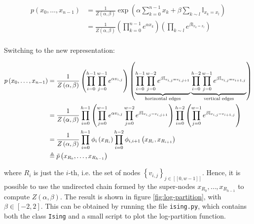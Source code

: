 \documentclass[a4paper, 11pt]{article}
\begin{document}
\begin{enumerate}[resume]
    \begin{equation*}
        \begin{aligned}
        p \left( x_0, \dots, x_{n-1} \right) &= \frac{1}{Z \left( \alpha, \beta \right)} \exp \left( \alpha \sum_{k=0}^{n-1} x_k + \beta \sum_{k \sim l} \mathbb{I}_{x_k = x_l} \right) \\
        &= \frac{1}{Z \left( \alpha, \beta \right)} \left( \prod_{k=0}^{n-1} e^{\alpha x_k} \right) \left( \prod_{k \sim l} e^{\beta \mathbb{I}_{x_k = x_l}} \right) \\
        \end{aligned}
    \end{equation*}
    
    Switching to the new representation:
    
    \begin{equation*}
        \begin{aligned}
        p \left( x_0, \dots, x_{n-1} \right) &= \frac{1}{Z \left( \alpha, \beta \right)} \left( \prod_{i=0}^{h-1} \prod_{j=0}^{w-1} e^{\alpha v_{i, j}} \right) \left( \underbrace{\prod_{i=0}^{h-1} \prod_{j=0}^{w-2} e^{\beta \mathbb{I}_{v_{i, j} = v_{i, j+1}}}}_{\text{horizontal edges}} \underbrace{\prod_{i=0}^{h-2} \prod_{j=0}^{w-1} e^{\beta \mathbb{I}_{v_{i, j} = v_{i+1, j}}}}_{\text{vertical edges}} \right) \\
        &= \frac{1}{Z \left( \alpha, \beta \right)} \prod_{i=0}^{h-1} \left( \prod_{j=0}^{w-1} e^{\alpha v_{i, j}} \prod_{j=0}^{w-2} e^{\beta \mathbb{I}_{v_{i, j} = v_{i, j+1}}} \right) \prod_{i=0}^{h-2} \left( \prod_{j=0}^{w-1} e^{\beta \mathbb{I}_{v_{i, j} = v_{i+1, j}}} \right) \\
        &= \frac{1}{Z \left( \alpha, \beta \right)} \prod_{i=0}^{h-1} \phi_{i} \left( x_{R_i} \right) \prod_{i=0}^{h-2} \phi_{i, i+1} \left( x_{R_i}, x_{R_{i+1}} \right) \\
        &\triangleq \Tilde{p} \left( x_{R_0}, \dots, x_{R_{h-1}} \right)
        \end{aligned}
    \end{equation*}

    where $R_i$ is just the $i$-th, i.e. the set of nodes $\left\{ v_{i, j} \right\}_{j \in [\![ 0, w-1 ]\!]}$. Hence, it is possible to use the undirected chain formed by the super-nodes $x_{R_0}, \dots, x_{R_{h-1}}$ to compute $Z \left( \alpha, \beta \right)$. The result is shown in figure \ref{fig:log-partition}, with $\beta \in [-2, 2]$. This can be obtained by running the file \texttt{ising.py}, which contains both the class \texttt{Ising} and a small script to plot the log-partition function.
    

\end{enumerate}
\end{document}
